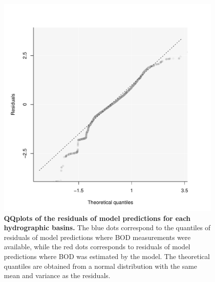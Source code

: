\documentclass[11pt, oneside]{article}
\begin{document}
\begin{figure}[H]
\begin{center}
\includegraphics[page=1, width=1\linewidth]{b0_6_3/out_mTL/fig_qqplot_residuals.pdf}
\caption{
    \textbf{QQplots of the residuals of model predictions for each hydrographic basins.}
    The blue dots correspond to the quantiles of residuals of model predictions where BOD measurements were available, while the red dots corresponds to residuals of model predictions where BOD was estimated by the model.
    The theoretical quantiles are obtained from a normal distribution with the same mean and variance as the residuals.
} 
\end{center}
\end{figure}
\end{document}
